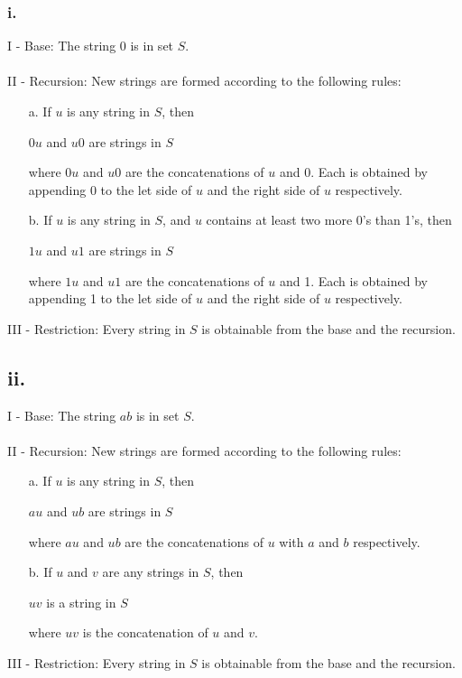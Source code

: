 \documentclass[12pt]{article}
\begin{document}
\subsubsection*{i.}
I - Base: The string 0 is in set $S$.
\\ \\
II - Recursion: New strings are formed according to the following rules:
\begin{itemize}
    \item [a.] If $u$ is any string in $S$, then
    \begin{center}
        $0u$ and $u0$ are strings in $S$\\
    \end{center}
    where $0u$ and $u0$ are the concatenations of $u$ and 0. Each is obtained by appending 0 to the let side of $u$ and the right side of $u$ respectively.
    \item [b.] If $u$ is any string in $S$, and $u$ contains at least two more 0's than 1's, then
    \begin{center}
        $1u$ and $u1$ are strings in $S$\\
    \end{center}
    where $1u$ and $u1$ are the concatenations of $u$ and 1. Each is obtained by appending 1 to the let side of $u$ and the right side of $u$ respectively.
\end{itemize}
III - Restriction: Every string in $S$ is obtainable from the base and the recursion.
\subsection*{ii.}
I - Base: The string $ab$ is in set $S$.
\\ \\
II - Recursion: New strings are formed according to the following rules:
\begin{itemize}
    \item [a.] If $u$ is any string in $S$, then 
    \begin{center}
        $au$ and $ub$ are strings in $S$\\
    \end{center}
    where $au$ and $ub$ are the concatenations of $u$ with $a$ and $b$ respectively.
    \item [b.] If $u$ and $v$ are any strings in $S$, then
    \begin{center}
        $uv$ is a string in $S$\\
    \end{center}
    where $uv$ is the concatenation of $u$ and $v$.
\end{itemize}
III - Restriction: Every string in $S$ is obtainable from the base and the recursion.
\end{document}
